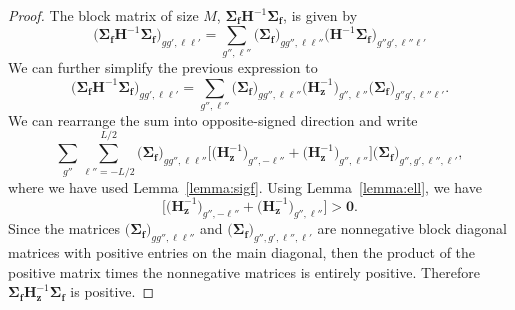 \begin{proof}
	The block matrix of size $M$, $\mathbf{\Sigma_{f}} \mathbf{H}^{-1} \mathbf{\Sigma_{f}}$, is given by
	\begin{equation}
		\big ( \mathbf{\Sigma_{f}} \mathbf{H}^{-1} \mathbf{\Sigma_{f}} \big )_{gg',\ell \ell'} = \sum_{g'', \ell''} \big (\mathbf{\Sigma_{f}} \big )_{gg'',\ell \ell''} \big (\mathbf{H}^{-1} \mathbf{\Sigma_{f}} \big )_{g''g',\ell''\ell'}
	\end{equation}
We can further simplify the previous expression to
	\begin{equation}
		\big ( \mathbf{\Sigma_{f}} \mathbf{H}^{-1} \mathbf{\Sigma_{f}} \big )_{gg',\ell \ell'} = \sum_{g'',\ell''} \big ( \mathbf{\Sigma_{f}} \big )_{gg'',\ell \ell''} \big ( \mathbf{H}_{\mathbf{z}}^{-1} \big )_{g'',\ell''} \big ( \mathbf{\Sigma_{f}} \big )_{g''g',\ell''\ell'}.
	\end{equation}
	We can rearrange the sum into opposite-signed direction and write
	\begin{equation}
		\sum_{g''} \sum_{\ell''=-L/2}^{L/2} \big ( \mathbf{\Sigma_{f}} \big )_{gg'',\ell\ell''} \bigg [ \big ( \mathbf{H}_{\mathbf{z}}^{-1} \big )_{g'',-\ell''} + \big ( \mathbf{H}_{\mathbf{z}}^{-1} \big )_{g'',\ell''} \bigg ] \big ( \mathbf{\Sigma_{f}} \big )_{g'',g',\ell'',\ell'},
	\end{equation}
	where we have used Lemma~\ref{lemma:sigf}. Using Lemma~\ref{lemma:ell}, we have
		\begin{equation}
			\bigg [ \big ( \mathbf{H}_{\mathbf{z}}^{-1} \big )_{g'',-\ell''} + \big ( \mathbf{H}_{\mathbf{z}}^{-1} \big )_{g'',\ell''} \bigg ] > \mathbf{0}. 		\end{equation}
			Since the matrices $\big ( \mathbf{\Sigma_{f}} \big )_{gg'',\ell\ell''}$ and $ \big ( \mathbf{\Sigma_{f}} \big )_{g'',g',\ell'',\ell'}$ are nonnegative block diagonal matrices with positive entries on the main diagonal, then the product of the positive matrix times the nonnegative matrices is entirely positive. Therefore $\mathbf{\Sigma_{f}}\mathbf{H}_{\mathbf{z}}^{-1}\mathbf{\Sigma_{f}}$ is positive. 
\end{proof}

